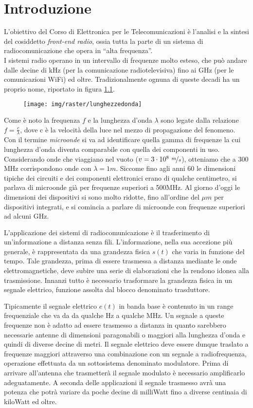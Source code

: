 \chapter{Introduzione}
L'obiettivo del Corso di Elettronica per le Telecomunicazioni è l'analisi e la sintesi del cosiddetto \textit{front-end radio}, ossia tutta la parte di un sistema di radiocomunicazione che opera in ``alta frequenza''.
\\
I sistemi radio operano in un intervallo di frequenze molto esteso, che può andare dalle decine di kHz (per la comunicazione radiotelevisiva) fino ai GHz (per le comunicazioni WiFi) ed oltre. Tradizionalmente ognuna di queste decadi ha un proprio nome, riportato in figura \ref{fig:lunghezzedonda}.

\begin{figure}[hbt]
	\centering
	\texttt{[image: img/raster/lunghezzedonda]}
	\caption{}
	\label{fig:lunghezzedonda}
\end{figure}


Come è noto la frequenza $f$ e la lunghezza d'onda $\lambda$ sono legate dalla relazione $f=\frac{c}{\lambda}$, dove c è la velocità della luce nel mezzo di propagazione del fenomeno. Con il termine \textit{microonde} si va ad identificare quella gamma di frequenze la cui lunghezza d'onda diventa comparabile con quella dei componenti in uso.
Considerando onde che viaggiano nel vuoto ($v = 3\cdot10^8~ \nicefrac{m}{s}$), otteniamo che a 300 MHz corrispondono onde con $\lambda = 1m$. Siccome fino agli anni 60 le dimensioni tipiche dei circuiti e dei componenti elettronici erano di qualche centimetro, si parlava di microonde già per frequenze superiori a 500MHz. Al giorno d'oggi le dimensioni dei dispositivi si sono molto ridotte, fino all'ordine del $\mu m$ per dispositivi integrati, e si comincia a parlare di microonde con frequenze superiori ad alcuni GHz.

L'applicazione dei sistemi di radiocomunicazione è il trasferimento di un'informazione a distanza senza fili. L'informazione, nella sua accezione più generale, è rappresentata da una grandezza fisica $s(t)$ che varia in funzione del tempo. Tale grandezza, prima di essere trasmessa a distanza mediante le onde elettromagnetiche, deve subire una serie di elaborazioni che la rendono idonea alla trasmissione. Innanzi tutto è necessario trasformare la grandezza fisica in un segnale elettrico, funzione assolta dal blocco denominato trasduttore.

Tipicamente il segnale elettrico $e(t)$ in banda base è contenuto in un range frequenziale che va da da qualche Hz a qualche MHz. Un segnale a queste frequenze non è adatto ad essere trasmesso a distanza in quanto sarebbero necessarie antenne di dimensioni paragonabili o maggiori alla lunghezza d'onda e quindi di diverse decine di metri. Il segnale elettrico deve essere dunque traslato a frequenze maggiori attraverso una combinazione con un segnale a radiofrequenza, operazione effettuata da un sottosistema denominato modulatore. Prima di arrivare all'antenna che trasmetterà il segnale modulato è necessario amplificarlo adeguatamente. A seconda delle applicazioni il segnale trasmesso avrà una potenza che potrà variare da poche decine di milliWatt fino a diverse centinaia di kiloWatt ed oltre. 

